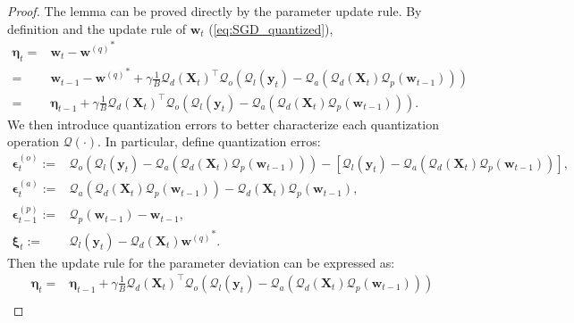 \documentclass[11pt, letterpaper]{article}
\begin{document}
\begin{proof}
    The lemma can be proved directly by the parameter update rule. By definition and the update rule of $\mathbf{w}_t$ (\ref{eq:SGD_quantized}),
    \begin{equation*}
        \begin{aligned}
            \boldsymbol{\eta}_t=&\mathbf{w}_t - {\mathbf{w}^{(q)}}^*\\
            =&\mathbf{w}_{t-1}-{\mathbf{w}^{(q)}}^*+\gamma \frac{1}{B}\mathcal{Q}_d(\mathbf{X}_t)^\top \mathcal{Q}_o\left(\mathcal{Q}_l(\mathbf{y}_t)-\mathcal{Q}_a\left(\mathcal{Q}_d(\mathbf{X}_t)\mathcal{Q}_p(\mathbf{w}_{t-1})\right)\right)\\
            =&\boldsymbol{\eta}_{t-1}+\gamma \frac{1}{B}\mathcal{Q}_d(\mathbf{X}_t)^\top \mathcal{Q}_o\left(\mathcal{Q}_l(\mathbf{y}_t)-\mathcal{Q}_a\left(\mathcal{Q}_d(\mathbf{X}_t)\mathcal{Q}_p(\mathbf{w}_{t-1})\right)\right).
        \end{aligned}
    \end{equation*}
    We then introduce quantization errors to better characterize each quantization operation $\mathcal{Q}(\cdot)$. In particular, define quantization erros:
    \begin{equation*}
        \begin{aligned}
            \boldsymbol{\epsilon}_t^{(o)}:=&\mathcal{Q}_o\left(\mathcal{Q}_l(\mathbf{y}_t)-\mathcal{Q}_a\left(\mathcal{Q}_d(\mathbf{X}_t)\mathcal{Q}_p(\mathbf{w}_{t-1})\right)\right)-\left[\mathcal{Q}_l(\mathbf{y}_t)-\mathcal{Q}_a\left(\mathcal{Q}_d(\mathbf{X}_t)\mathcal{Q}_p(\mathbf{w}_{t-1})\right)\right],\\
            \boldsymbol{\epsilon}_t^{(a)}:=&\mathcal{Q}_a\left(\mathcal{Q}_d(\mathbf{X}_t)\mathcal{Q}_p(\mathbf{w}_{t-1})\right)-\mathcal{Q}_d(\mathbf{X}_t)\mathcal{Q}_p(\mathbf{w}_{t-1}),\\
            \boldsymbol{\epsilon}_{t-1}^{(p)}:=&\mathcal{Q}_p(\mathbf{w}_{t-1})-\mathbf{w}_{t-1},\\
            \boldsymbol{\xi}_t:=&\mathcal{Q}_l(\mathbf{y}_t)-\mathcal{Q}_d(\mathbf{X}_t){\mathbf{w}^{(q)}}^*.
        \end{aligned}
    \end{equation*}
    Then the update rule for the parameter deviation can be expressed as:
    \begin{equation*}
        \begin{aligned}
            \boldsymbol{\eta}_t = &\boldsymbol{\eta}_{t-1}+\gamma \frac{1}{B}\mathcal{Q}_d(\mathbf{X}_t)^\top \mathcal{Q}_o\left(\mathcal{Q}_l(\mathbf{y}_t)-\mathcal{Q}_a\left(\mathcal{Q}_d(\mathbf{X}_t)\mathcal{Q}_p(\mathbf{w}_{t-1})\right)\right)\\

\end{aligned}
\end{equation*}
\end{proof}
\end{document}
